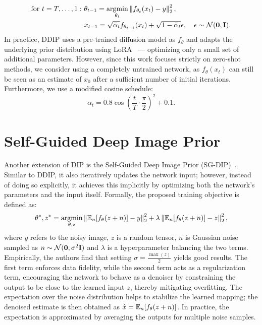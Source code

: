 \begin{align}
    \text{for}\ t=T,\dots,1:\ &\theta_{t-1} = \argmin_{\theta_t} \norm{f_{\theta_t}(x_t) - y}_2^2,\\
    &x_{t-1} = \sqrt{\bar{\alpha}_t}f_{\theta_{t-1}}(x_t) + \sqrt{1-\bar{\alpha}_t}\epsilon, \quad \epsilon \sim \unormal.
\end{align}
In practice, DDIP uses a pre-trained diffusion model as $f_\theta$ and adapts the underlying prior distribution using LoRA~\cite{LoRA} --- optimizing only a small set of additional parameters.
However, since this work focuses strictly on zero-shot methods, we consider using a completely untrained network, as $f_\theta(x_t)$ can still be seen as an estimate of $x_0$ after a sufficient number of initial iterations.
Furthermore, we use a modified cosine schedule: 
\begin{equation}
    \bar{\alpha}_t = 0.8\cos\left(\frac{t}{T}\cdot\frac{\pi}{2}\right)^2+0.1.
\end{equation}

\section{Self-Guided Deep Image Prior}\label{sec:SG-DIP}

Another extension of DIP is the Self-Guided Deep Image Prior (SG-DIP)~\cite{SG-DIP}.
Similar to DDIP, it also iteratively updates the network input; however, instead of doing so explicitly, it achieves this implicitly by optimizing both the network's parameters and the input itself.
Formally, the proposed training objective is defined as:
\begin{equation}
    \theta^*,z^* = \argmin_{\theta, z} \norm{\E[n]{f_\theta(z + n)} - y}_2^2 + \lambda\norm{\E[n]{f_\theta(z + n)} - z}_2^2,
\end{equation}
where $y$ refers to the noisy image, $z$ is a random tensor, $n$ is Gaussian noise sampled as $n \sim \normal$ and $\lambda$ is a hyperparameter balancing the two terms.
Empirically, the authors find that setting $\sigma = \frac{\max(z)}{2}$ yields good results.
The first term enforces data fidelity, while the second term acts as a regularization term, encouraging the network to behave as a denoiser by constraining the output to be close to the learned input $z$, thereby mitigating overfitting. 
The expectation over the noise distribution helps to stabilize the learned mapping; the denoised estimate is then obtained as $\hat{x} = \E[n]{f_\theta(z + n)}$.
In practice, the expectation is approximated by averaging the outputs for multiple noise samples.

